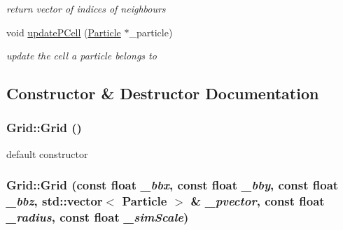 \begin{DoxyCompactItemize}
\begin{DoxyCompactList}\small\item\em return vector of indices of neighbours \item\end{DoxyCompactList}\item 
void \hyperlink{classGrid_a2e82b95aada21472f5ffb9a4cd9d8ca6}{updatePCell} (\hyperlink{classParticle}{Particle} $\ast$\_\-particle)
\begin{DoxyCompactList}\small\item\em update the cell a particle belongs to \item\end{DoxyCompactList}\end{DoxyCompactItemize}


\subsection{Constructor \& Destructor Documentation}
\hypertarget{classGrid_a4ac9ff4f63552b4c61ff90fcb35ad66c}{
\subsubsection[{Grid}]{\setlength{\rightskip}{0pt plus 5cm}Grid::Grid ()}}
\label{classGrid_a4ac9ff4f63552b4c61ff90fcb35ad66c}


default constructor \hypertarget{classGrid_ab1c364659f2e78f3066a27595f146117}{
\subsubsection[{Grid}]{\setlength{\rightskip}{0pt plus 5cm}Grid::Grid (const float {\em \_\-bbx}, \/  const float {\em \_\-bby}, \/  const float {\em \_\-bbz}, \/  std::vector$<$ {\bf Particle} $>$ \& {\em \_\-pvector}, \/  const float {\em \_\-radius}, \/  const float {\em \_\-simScale})}}
\label{classGrid_ab1c364659f2e78f3066a27595f146117}


